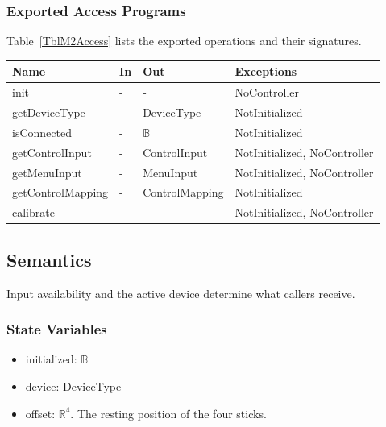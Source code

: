 \documentclass[12pt, titlepage]{article}
\begin{document}
\subsubsection{Exported Access Programs}

Table~\ref{TblM2Access} lists the exported operations and their signatures.

\begin{center}
\begin{minipage}{\textwidth}
\begin{tabularx}{\textwidth}{p{3.6cm} p{1.4cm} p{3.2cm} X}
\toprule
\textbf{Name} & \textbf{In} & \textbf{Out} & \textbf{Exceptions} \\
\midrule
init & - & - & NoController \\
getDeviceType & - & DeviceType & NotInitialized \\
isConnected & - & $\mathbb{B}$ & NotInitialized \\
getControlInput & - & ControlInput & NotInitialized, NoController \\
getMenuInput & - & MenuInput & NotInitialized, NoController \\
getControlMapping & - & ControlMapping & NotInitialized \\
calibrate & - & - & NotInitialized, NoController \\
\bottomrule
\end{tabularx}
\label{TblM2Access}
\end{minipage}
\end{center}

\subsection{Semantics}

Input availability and the active device determine what callers receive.

\subsubsection{State Variables}

\begin{itemize}
\item initialized: $\mathbb{B}$
\item device: DeviceType
\item offset: $\mathbb{R}^4$. The resting position of the four sticks.
\end{itemize}
\end{document}
